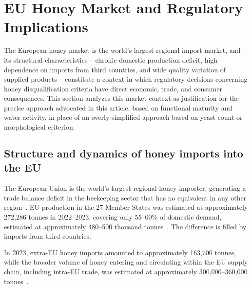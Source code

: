 
\section{EU Honey Market and Regulatory Implications}

The European honey market is the world's largest regional import
market, and its structural characteristics -- chronic domestic
production deficit, high dependence on imports from third countries,
and wide quality variation of supplied products -- constitute
a context in which regulatory decisions concerning honey
disqualification criteria have direct economic, trade, and consumer
consequences. This section analyzes this market context as
justification for the precise approach advocated in this article,
based on functional maturity and water activity, in place of an
overly simplified approach based on yeast count or morphological
criterion.

\subsection{Structure and dynamics of honey imports into the EU}

The European Union is the world's largest regional honey importer,
generating a trade balance deficit in the beekeeping sector that
has no equivalent in any other region~\cite{cbi2024,pollinatorhub2025}.
EU production in the 27 Member States was estimated at approximately 272,286 tonnes in 2022–2023, covering only 55–60\% of domestic demand, estimated at approximately 480--500 thousand tonnes~\cite{pollinatorhub2025,ec_honey_autumn2024}.
The difference is filled by imports from third countries.

In 2023, extra-EU honey imports amounted to approximately 163,700 tonnes, while the broader volume of honey entering and circulating within the EU supply chain, including intra-EU trade, was estimated at approximately 300,000–360,000 tonnes~\cite{cbi2024}.


